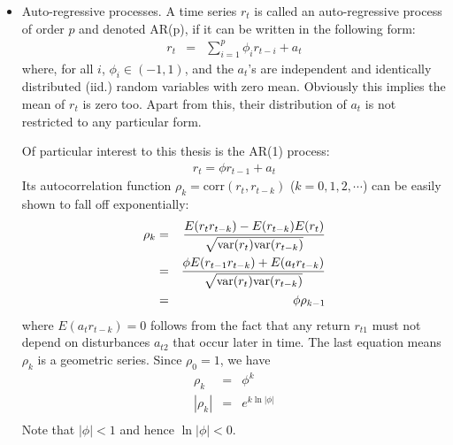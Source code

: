 \documentclass{book}
\begin{document}
\begin{itemize}
\item Auto-regressive processes. A time series $r_t$ is called an
  auto-regressive process of order $p$ and denoted AR(p), if it can be
  written in the following form:
  \begin{eqnarray*}
    r_t &=& \sum_{i=1}^p \phi_i r_{t-i} + a_t
  \end{eqnarray*}
  where, for all $i$, $\phi_i \in (-1, 1)$, and the $a_t$'s are
  independent and identically distributed (iid.) random variables with
  zero mean. Obviously this implies the mean of $r_t$ is zero
  too. Apart from this, their distribution of $a_t$ is not restricted
  to any particular form.
  
  Of particular interest to this thesis is the AR(1) process:
  \begin{eqnarray*}
    r_t = \phi r_{t-1} + a_t
  \end{eqnarray*}
  Its autocorrelation function $\rho_k = \text{corr}(r_t, r_{t-k})$
  ($k = 0, 1, 2, \cdots$) can be easily shown to fall off
  exponentially:
  \begin{eqnarray*}
    \rho_k &=& {E(r_tr_{t-k}) - E(r_{t-k})E(r_{t}) \over
      \sqrt{\text{var}(r_t) \text{var}(r_{t-k})}} \\
    &=& {\phi E(r_{t-1}r_{t-k}) + E(a_t r_{t-k})
      \over
      \sqrt{\text{var}(r_t) \text{var}(r_{t-k})}
    } \\
    &=& \phi \rho_{k-1}
  \end{eqnarray*}
  where $E(a_t r_{t-k}) = 0$ follows from the fact that any return
  $r_{t1}$ must not depend on disturbances $a_{t2}$ that occur later
  in time. The last equation means $\rho_k$ is a geometric series. Since
  $\rho_0 = 1$, we have
  \begin{eqnarray*}
    \rho_k &=& \phi^k \\
    |\rho_k| &=& e^{k\ln|\phi|} \\
  \end{eqnarray*}
  Note that $|\phi| < 1$ and hence $\ln|\phi| < 0$.


\end{itemize}
\end{document}
